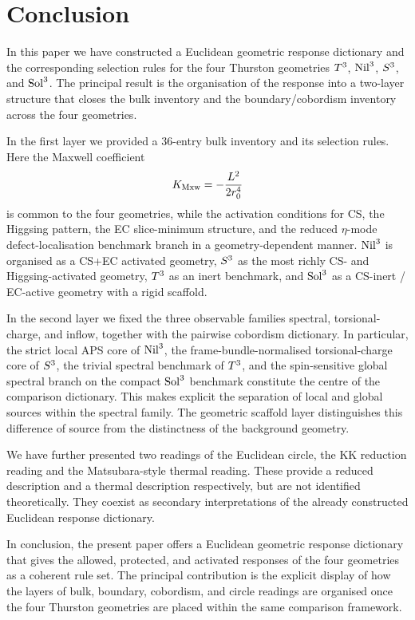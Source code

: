 \section{Conclusion}
\label{sec:conclusion}

In this paper we have constructed a Euclidean geometric response dictionary
and the corresponding selection rules for the four Thurston geometries
$T^3$, $\mathrm{Nil}^3$, $S^3$, and $\mathrm{Sol}^3$.  The principal result is
the organisation of the response into a two-layer structure that closes the
bulk inventory and the boundary/cobordism inventory across the four
geometries.

In the first layer we provided a 36-entry bulk inventory and its selection
rules.  Here the Maxwell coefficient
\begin{equation}
  K_{\mathrm{Mxw}} = -\frac{L^2}{2r_0^4}
\end{equation}
is common to the four geometries, while the activation conditions for CS,
the Higgsing pattern, the EC slice-minimum structure, and the reduced
$\eta$-mode defect-localisation benchmark branch in a geometry-dependent
manner.  $\mathrm{Nil}^3$ is organised as a CS+EC activated geometry, $S^3$
as the most richly CS- and Higgsing-activated geometry, $T^3$ as an
inert benchmark, and $\mathrm{Sol}^3$ as a CS-inert / EC-active geometry with a
rigid scaffold.

In the second layer we fixed the three observable families spectral,
torsional-charge, and inflow, together with the pairwise cobordism
dictionary.  In particular, the strict local APS core of $\mathrm{Nil}^3$, the
frame-bundle-normalised torsional-charge core of $S^3$, the trivial
spectral benchmark of $T^3$, and the spin-sensitive global spectral
branch on the compact $\mathrm{Sol}^3$ benchmark constitute the centre of the
comparison dictionary.  This makes explicit the separation of local and
global sources within the spectral family.  The geometric scaffold layer
distinguishes this difference of source from the distinctness of the
background geometry.

We have further presented two readings of the Euclidean circle, the KK
reduction reading and the Matsubara-style thermal reading.  These provide a
reduced description and a thermal description respectively, but are not
identified theoretically.  They coexist as secondary interpretations of the
already constructed Euclidean response dictionary.

In conclusion, the present paper offers a Euclidean geometric response
dictionary that gives the allowed, protected, and activated responses of the
four geometries as a coherent rule set.  The principal contribution is the
explicit display of how the layers of bulk, boundary, cobordism, and circle
readings are organised once the four Thurston geometries are placed within
the same comparison framework.
